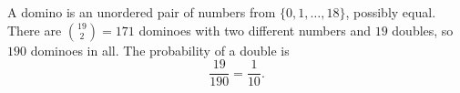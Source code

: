 A domino is an unordered pair of numbers from $\{0,1,\dots,18\}$, possibly equal. There are $\binom{19}2=171$ dominoes with two different numbers and $19$ doubles, so $190$ dominoes in all. The probability of a double is
\[
\dfrac{19}{190}=\boxed{\dfrac{1}{10}}.
\]
